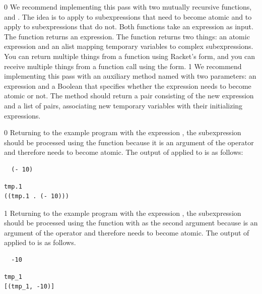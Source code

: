 \documentclass[7x10]{TimesAPriori_MIT}%
\def\racketEd{0}
\def\pythonEd{1}
\def\edition{0}
\numberwithin{theorem}{chapter}
\numberwithin{definition}{chapter}
\numberwithin{equation}{chapter}
\begin{document}
{\if\edition\racketEd
We recommend implementing this pass with two mutually recursive
functions,  and . The idea is to apply
 to subexpressions that need to become atomic and to
apply  to subexpressions that do not.  Both functions
take an \LangVar{} expression as input.  The  function
returns an expression.  The  function returns two
things: an atomic expression and an alist mapping temporary variables to
complex subexpressions. You can return multiple things from a function
using Racket's  form, and you can receive multiple things
from a function call using the  form.
\fi}
%
{\if\edition\pythonEd
%
We recommend implementing this pass with an auxiliary method named
 with two parameters: an \LangVar{} expression and a
Boolean that specifies whether the expression needs to become atomic
or not.  The  method should return a pair consisting of
the new expression and a list of pairs, associating new temporary
variables with their initializing expressions.
%
\fi}

{\if\edition\racketEd
%
Returning to the example program with the expression , the subexpression  should be processed using the
 function because it is an argument of the \code{+}
operator and therefore needs to become atomic.  The output of
 applied to  is as follows:
\begin{transformation}
\begin{lstlisting}
  (- 10)
\end{lstlisting}
\compilesto
\begin{lstlisting}
tmp.1
((tmp.1 . (- 10)))
\end{lstlisting}
\end{transformation}
\fi}
%
{\if\edition\pythonEd
%
Returning to the example program with the expression ,
the subexpression  should be processed using the
 function with  as the second argument
because  is an argument of the \code{+} operator and
therefore needs to become atomic.  The output of 
applied to  is as follows.
\begin{transformation}
\begin{lstlisting}
  -10
\end{lstlisting}
\compilesto
\begin{lstlisting}
tmp_1
[(tmp_1, -10)]
\end{lstlisting}
\end{transformation}
%  
\fi}
\end{document}
